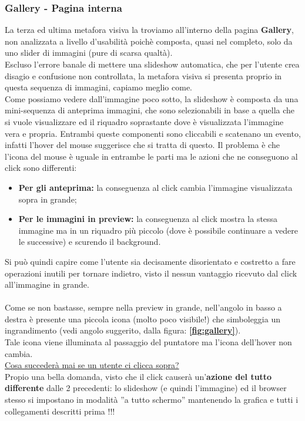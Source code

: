 \documentclass[../Relazione.tex]{subfiles}
\begin{document}
		\subsubsection{Gallery - Pagina interna}
		La terza ed ultima metafora visiva la troviamo all'interno della pagina \textbf{Gallery}, non analizzata a livello d'usabilità poichè composta, quasi nel completo, solo da uno slider di immagini (pure di scarsa qualtà).\\
		Escluso l'errore banale di mettere una slideshow automatica, che per l'utente crea disagio e confusione non controllata, la metafora visiva si presenta proprio in questa sequenza di immagini, capiamo meglio come.\\
		Come possiamo vedere dall'immagine poco sotto, la slideshow è composta da una mini-sequenza di anteprima immagini, che sono selezionabili in base a quella che si vuole visualizzare ed il riquadro soprastante dove è visualizzata l'immagine vera e propria.
		Entrambi queste componenti sono cliccabili e scatenano un evento, infatti l'hover del mouse suggerisce che si tratta di questo. Il problema è che l'icona del mouse è uguale in entrambe le parti ma le azioni che ne conseguono al click sono differenti:
		\begin{itemize}
			\item \textbf{Per gli anteprima:} la conseguenza al click cambia l'immagine visualizzata sopra in grande;
			\item \textbf{Per le immagini in preview:} la conseguenza al click mostra la stessa immagine ma in un riquadro più piccolo (dove è possibile continuare a vedere le successive) e scurendo il background.
		\end{itemize}
		Si può quindi capire come l'utente sia decisamente disorientato e costretto a fare operazioni inutili per tornare indietro, visto il nessun vantaggio ricevuto dal click all'immagine in grande.\\\\
		Come se non bastasse, sempre nella preview in grande, nell'angolo in basso a destra è presente una piccola icona (molto poco visibile!) che simboleggia un ingrandimento (vedi angolo suggerito, dalla figura: \textbf{\ref{fig:gallery}}).\\
		Tale icona viene illuminata al passaggio del puntatore ma l'icona dell'hover non cambia.\\
		\underline{Cosa succederà mai se un utente ci clicca sopra?}\\
		Propio una bella domanda, visto che il click causerà un'\textbf{azione del tutto differente} dalle 2 precedenti: lo slideshow (e quindi l'immagine) ed il browser stesso si impostano in modalità ''a tutto schermo'' mantenendo la grafica e tutti i collegamenti descritti prima !!!\\
\end{document}
